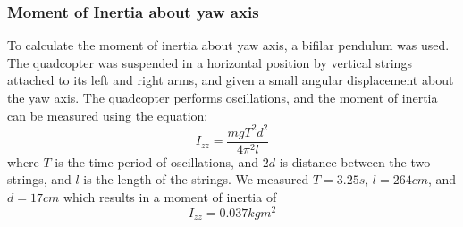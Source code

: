 \documentclass{article}
\begin{document}
\subsubsection{Moment of Inertia about yaw axis}
To calculate the moment of inertia about yaw axis, a bifilar pendulum was used. The quadcopter was suspended in a horizontal position by vertical strings attached to its left and right arms, and given a small angular displacement about the yaw axis. The quadcopter performs oscillations, and the moment of inertia can be measured using the equation:
\begin{equation}
I_{zz} = \frac{mgT^2d^2}{4\pi^2l}
\end{equation}
where $T$ is the time period of oscillations, and $2d$ is distance between the two strings, and $l$ is the length of the strings. 
We measured $T = 3.25 s$, $l = 264 cm$, and $d = 17 cm$ which results in a moment of inertia of 
\begin{equation}
I_{zz} = 0.037 kg m^2
\end{equation}
\end{document}
